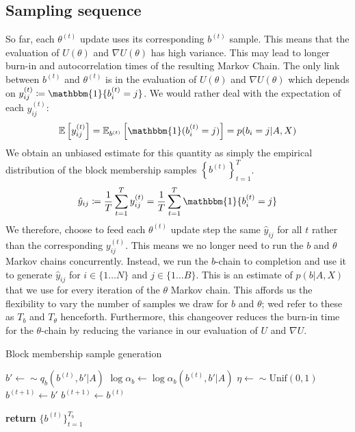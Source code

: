 \documentclass{article}
\newcommand{\one}{\mathbbm{1}}
\newcommand{\Expect}{\mathbb{E}}
\begin{document}
\subsection{Sampling sequence}

So far, each $\theta^{(t)}$ update uses its corresponding $b^{(t)}$ sample. This means that the evaluation of $U(\theta)$ and $\nabla U(\theta)$ has high variance. This may lead to longer burn-in and autocorrelation times of the resulting Markov Chain. The only link between $b^{(t)}$ and $\theta^{(t)}$ is in the evaluation of $U(\theta)$ and $\nabla U(\theta)$ which depends on $y_{ij}^{(t)} \coloneqq \one\{b_i^{(t)} = j\}$. We would rather deal with the expectation of each $y_{ij}^{(t)}$:
%
\begin{equation}
	\Expect \left[ y_{ij}^{(t)} \right] = \Expect_{b^{(t)}} \left[ \one(b_{i}^{(t)} = j) \right]
	= p(b_i = j | A, X)
\end{equation}
%
We obtain an unbiased estimate for this quantity as simply the empirical distribution of the block membership samples $\left\{ b^{(t)} \right\}_{t=1}^T$.
%
\begin{equation}
	\hat{y}_{ij} \coloneqq \frac{1}{T} \sum_{t=1}^{T} y_{ij}^{(t)} = \frac{1}{T} \sum_{t=1}^{T} \one\{b_i^{(t)} = j\}
\end{equation}
%
We therefore, choose to feed each $\theta^{(t)}$ update step the same $\hat{y}_{ij}$ for all $t$ rather than the corresponding $y^{(t)}_{ij}$. This means we no longer need to run the $b$ and $\theta$ Markov chains concurrently. Instead, we run the $b$-chain to completion and use it to generate $\hat{y}_{ij}$ for $i \in \{1 \dots N\}$ and $j \in \{1 \dots B\}$. This is an estimate of $p(b | A, X)$ that we use for every iteration of the $\theta$ Markov chain. This affords us the flexibility to vary the number of samples we draw for $b$ and $\theta$; wed refer to these as $T_b$ and $T_\theta$ henceforth. Furthermore, this changeover reduces the burn-in time for the $\theta$-chain by reducing the variance in our evaluation of $U$ and $\nabla U$.

\begin{algorithm} %
	\caption{Block membership sample generation} %
	\label{alg:b-samples} %
	\begin{algorithmic} %

			\STATE $b' \gets \sim q_b(b^{(t)}, b' | A)$
			\STATE $\log \alpha_b \gets \log \alpha_b(b^{(t)}, b' | A)$
			\STATE $\eta \gets \sim \textrm{Unif}(0,1)$
				\STATE $b^{(t+1)} \gets b'$
			\ELSE
				\STATE $b^{(t+1)} \gets b^{(t)}$
			\ENDIF
		\ENDFOR
		
		\STATE \textbf{return} $\{b^{(t)}\}_{t=1}^{T_b}$
		
	\end{algorithmic}
\end{algorithm}
\end{document}
